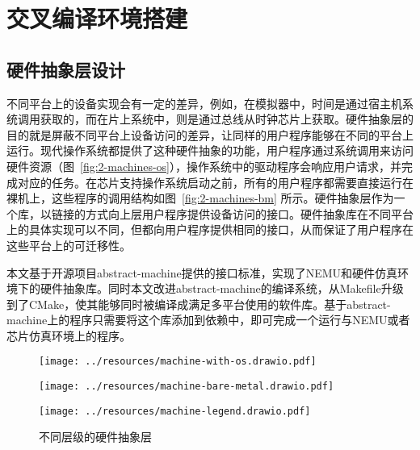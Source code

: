 \section{交叉编译环境搭建}

\subsection{硬件抽象层设计}

不同平台上的设备实现会有一定的差异，例如，在模拟器中，时间是通过宿主机系统调用获取的，而在片上系统中，则是通过总线从时钟芯片上获取。硬件抽象层的目的就是屏蔽不同平台上设备访问的差异，让同样的用户程序能够在不同的平台上运行。现代操作系统都提供了这种硬件抽象的功能，用户程序通过系统调用来访问硬件资源（图~\ref{fig:2-machines-os}），操作系统中的驱动程序会响应用户请求，并完成对应的任务。在芯片支持操作系统启动之前，所有的用户程序都需要直接运行在裸机上，这些程序的调用结构如图~\ref{fig:2-machines-bm} 所示。硬件抽象层作为一个库，以链接的方式向上层用户程序提供设备访问的接口。硬件抽象库在不同平台上的具体实现可以不同，但都向用户程序提供相同的接口，从而保证了用户程序在这些平台上的可迁移性。

本文基于开源项目abstract-machine提供的接口标准，实现了NEMU和硬件仿真环境下的硬件抽象库。同时本文改进abstract-machine的编译系统，从Makefile升级到了CMake，使其能够同时被编译成满足多平台使用的软件库。基于abstract-machine上的程序只需要将这个库添加到依赖中，即可完成一个运行与NEMU或者芯片仿真环境上的程序。

\begin{figure}
\centering

\begin{minipage}[t]{0.35\textwidth}
    \centering
    \texttt{[image: ../resources/machine-with-os.drawio.pdf]}
    \label{fig:2-machines-os}
\end{minipage}
\hfill
\begin{minipage}[t]{0.35\textwidth}
    \centering
    \texttt{[image: ../resources/machine-bare-metal.drawio.pdf]}
    \label{fig:2-machines-bm}
\end{minipage}
\hfill
\begin{minipage}[t]{0.15\textwidth}
    \centering
    \texttt{[image: ../resources/machine-legend.drawio.pdf]}
    \hfill
\end{minipage}
\caption{不同层级的硬件抽象层}
\label{fig:2-machines}
\end{figure}


